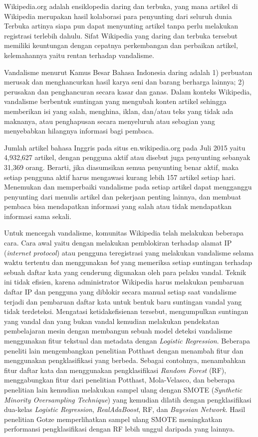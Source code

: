 Wikipedia.org adalah ensiklopedia daring dan terbuka, yang mana artikel di
Wikipedia merupakan hasil kolaborasi para penyunting dari seluruh dunia
Terbuka artinya siapa pun dapat menyunting artikel tanpa perlu melakukan
registrasi terlebih dahulu.
Sifat Wikipedia yang daring dan terbuka tersebut memiliki keuntungan dengan
cepatnya perkembangan dan perbaikan artikel, kelemahannya yaitu rentan terhadap
vandalisme.

Vandalisme menurut Kamus Besar Bahasa Indonesia daring adalah
1) perbuatan merusak dan menghancurkan hasil karya seni dan barang berharga
lainnya;
2) perusakan dan penghancuran secara kasar dan ganas.
Dalam konteks Wikipedia, vandalisme berbentuk suntingan yang mengubah
konten artikel sehingga memberikan isi yang salah, menghina, iklan,
dan/atau teks yang tidak ada maknanya, atau penghapusan secara
menyeluruh atau sebagian yang menyebabkan hilangnya informasi bagi pembaca.

Jumlah artikel bahasa Inggris pada situs en.wikipedia.org pada Juli 2015
yaitu 4,932,627 artikel, dengan pengguna aktif atau disebut juga
penyunting sebanyak 31,369 orang.
Berarti, jika diasumsikan semua penyunting benar aktif, maka setiap pengguna
aktif harus mengawasi kurang lebih 157 artikel setiap hari.
Menemukan dan memperbaiki vandalisme pada setiap artikel dapat mengganggu
penyunting dari menulis artikel dan pekerjaan penting lainnya, dan membuat
pembaca bisa mendapatkan informasi yang salah atau tidak mendapatkan informasi
sama sekali.

Untuk mencegah vandalisme, komunitas Wikipedia telah
melakukan beberapa cara.
Cara awal yaitu dengan melakukan pemblokiran terhadap alamat IP
(\textit{internet protocol}) atau pengguna teregistrasi yang melakukan
vandalisme selama waktu tertentu dan menggunakan \textit{bot} yang memeriksa
setiap suntingan terhadap sebuah daftar kata yang cenderung digunakan oleh para
pelaku vandal.
Teknik ini tidak efisien, karena administrator Wikipedia harus melakukan
pembaruan daftar IP dan pengguna yang diblokir secara manual setiap saat
vandalisme terjadi dan pembaruan daftar kata untuk bentuk baru suntingan vandal
yang tidak terdeteksi.
Mengatasi ketidakefisienan tersebut, \textcite{potthast2008automatic}
mengumpulkan suntingan yang vandal dan yang bukan vandal kemudian melakukan
pendekatan pembelajaran mesin dengan membangun sebuah model deteksi vandalisme
menggunakan
fitur tekstual dan metadata dengan \textit{Logistic Regression}.
Beberapa peneliti lain mengembangkan penelitian Potthast dengan menambah fitur
dan menggunakan pengklasifikasi yang berbeda. Sebagai contohnya,
\textcite{mola2012wikipedia} menambahkan fitur daftar kata dan menggunakan
pengklasifikasi \textit{Random Forest} (RF), \textcite{gotze2014advanced}
menggabungkan fitur dari penelitian Potthast, Mola-Velasco, dan beberapa
penelitian lain kemudian melakukan sampel ulang dengan SMOTE (\textit{Synthetic
Minority Oversampling Technique}) yang kemudian dilatih dengan pengklasifikasi
dua-kelas \textit{Logistic Regression}, \textit{RealAdaBoost}, RF, dan
\textit{Bayesian Network}.
Hasil penelitian Gotze memperlihatkan sampel ulang SMOTE meningkatkan
performansi pengklasifikasi dengan RF lebih unggul daripada yang lainnya.

